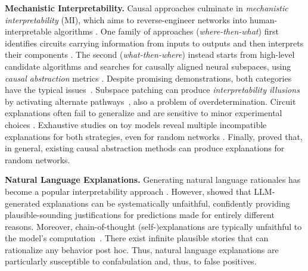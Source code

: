 \medskip
\noindent\textbf{Mechanistic Interpretability.}
Causal approaches culminate in \textit{mechanistic interpretability} (MI), which aims to reverse-engineer networks into human-interpretable algorithms \citep{olah2020zoom}. One family of approaches (\textit{where-then-what}) first identifies circuits carrying information from inputs to outputs and then interprets their components \citep{dunefsky2024transcodersinterpretablellmfeature,davies2024cognitiverevolutioninterpretabilityexplaining,NEURIPS2023_34e1dbe9}. The second (\textit{what-then-where}) instead starts from high-level candidate algorithms and searches for causally aligned neural subspaces, using \textit{causal abstraction} metrics \citep{Geiger-etal:2022:SAIL,pmlr-v162-geiger22a,Beckers_Halpern_2019}. Despite promising demonstrations, both categories have the typical issues~\citep{sharkey2025openproblemsmechanisticinterpretability}. Subspace patching can produce \textit{interpretability illusions} by activating alternate pathways~\citep{makelov2023subspacelookingforinterpretability}, also a problem of overdetermination. Circuit explanations often fail to generalize \citep{wang2022interpretabilitywildcircuitindirect,li2025interpretationpredictbehaviorunseen} and are sensitive to minor experimental choices \citep{meloux2025mechanisticinterpretabilitystatisticalestimation}. Exhaustive studies on toy models reveal multiple incompatible explanations for both strategies, even for random networks \citep{melouxeverything}. Finally, \citet{sutter2025nonlinearrepresentationdilemmacausal} proved that, in general, existing causal abstraction methods can produce explanations for random networks. 


\medskip
\noindent\textbf{Natural Language Explanations.}
Generating natural language rationales has become a popular interpretability approach \citep{marasovic-etal-2022-shot,wiegreffe-etal-2022-reframing}. However, \citet{ajwani2024llmgeneratedblackboxexplanationsadversarially} showed that LLM-generated explanations can be systematically unfaithful, confidently providing plausible-sounding justifications for predictions made for entirely different reasons. Moreover, chain-of-thought (self-)explanations are typically unfaithful to the model’s computation~\citep{lanham2023measuringfaithfulnesschainofthoughtreasoning,arcuschin2025chainofthought,turpin2023languagemodelsdontsay}. There exist infinite plausible stories that can rationalize any behavior post hoc. Thus, natural language explanations are particularly susceptible to confabulation and, thus, to false positives. 